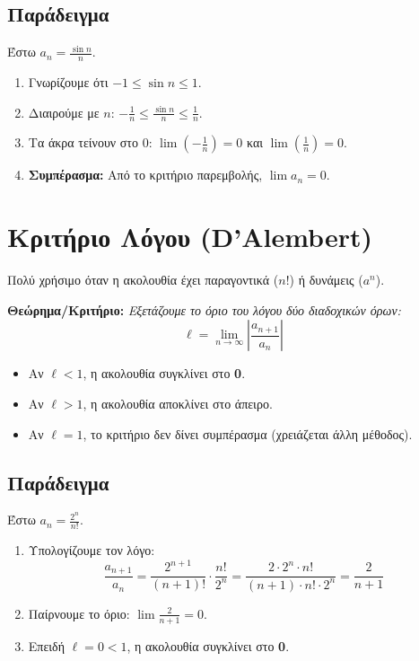 \documentclass[11pt,a4paper]{article}
\newcommand{\eng}[1]{\selectlanguage{english}#1\selectlanguage{greek}}
\newenvironment{criterion}
    {\vspace{10pt}\noindent\textbf{Θεώρημα/Κριτήριο:}\itshape}
    {\vspace{10pt}}
\begin{document}
\subsection*{Παράδειγμα}
Έστω $a_n = \frac{\sin n}{n}$.

\begin{enumerate}
    \item Γνωρίζουμε ότι $-1 \le \sin n \le 1$.
    \item Διαιρούμε με $n$: $-\frac{1}{n} \le \frac{\sin n}{n} \le \frac{1}{n}$.
    \item Τα άκρα τείνουν στο 0: $\lim (-\frac{1}{n}) = 0$ και $\lim (\frac{1}{n}) = 0$.
    \item \textbf{Συμπέρασμα:} Από το κριτήριο παρεμβολής, $\lim a_n = 0$.
\end{enumerate}

\section{Κριτήριο Λόγου (\eng{D'Alembert})}

Πολύ χρήσιμο όταν η ακολουθία έχει παραγοντικά ($n!$) ή δυνάμεις ($a^n$).

\begin{criterion}
Εξετάζουμε το όριο του λόγου δύο διαδοχικών όρων:
\[ \ell = \lim_{n \to \infty} \left| \frac{a_{n+1}}{a_n} \right| \]
\begin{itemize}
    \item Αν $\ell < 1$, η ακολουθία συγκλίνει στο \textbf{0}.
    \item Αν $\ell > 1$, η ακολουθία αποκλίνει στο άπειρο.
    \item Αν $\ell = 1$, το κριτήριο δεν δίνει συμπέρασμα (χρειάζεται άλλη μέθοδος).
\end{itemize}
\end{criterion}

\subsection*{Παράδειγμα}
Έστω $a_n = \frac{2^n}{n!}$.

\begin{enumerate}
    \item Υπολογίζουμε τον λόγο:
    \[ \frac{a_{n+1}}{a_n} = \frac{2^{n+1}}{(n+1)!} \cdot \frac{n!}{2^n} = \frac{2 \cdot 2^n \cdot n!}{(n+1) \cdot n! \cdot 2^n} = \frac{2}{n+1} \]
    \item Παίρνουμε το όριο: $\lim \frac{2}{n+1} = 0$.
    \item Επειδή $\ell = 0 < 1$, η ακολουθία συγκλίνει στο \textbf{0}.
\end{enumerate}
\end{document}
